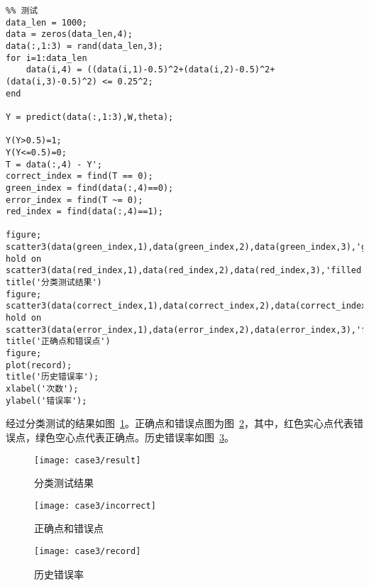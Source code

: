 \begin{lstlisting}
%% 测试
data_len = 1000;
data = zeros(data_len,4);
data(:,1:3) = rand(data_len,3);
for i=1:data_len
    data(i,4) = ((data(i,1)-0.5)^2+(data(i,2)-0.5)^2+(data(i,3)-0.5)^2) <= 0.25^2;
end

Y = predict(data(:,1:3),W,theta);

Y(Y>0.5)=1;
Y(Y<=0.5)=0;
T = data(:,4) - Y';
correct_index = find(T == 0);
green_index = find(data(:,4)==0);
error_index = find(T ~= 0);
red_index = find(data(:,4)==1);

figure;
scatter3(data(green_index,1),data(green_index,2),data(green_index,3),'g');
hold on
scatter3(data(red_index,1),data(red_index,2),data(red_index,3),'filled','r');
title('分类测试结果')
figure;
scatter3(data(correct_index,1),data(correct_index,2),data(correct_index,3),'g');
hold on
scatter3(data(error_index,1),data(error_index,2),data(error_index,3),'filled','r');
title('正确点和错误点')
figure;
plot(record);
title('历史错误率');
xlabel('次数');
ylabel('错误率');
\end{lstlisting}

经过分类测试的结果如图~\ref{fig:case3:result}。正确点和错误点图为图~\ref{fig:case3:incorrect}，其中，红色实心点代表错误点，绿色空心点代表正确点。历史错误率如图~\ref{fig:case3:record}。

\begin{figure}[h] 
 \centering
  \texttt{[image: case3/result]}
  \caption{分类测试结果}
  \label{fig:case3:result}
\end{figure}
\begin{figure}[h] 
 \centering
  \texttt{[image: case3/incorrect]}
  \caption{正确点和错误点}
  \label{fig:case3:incorrect}
\end{figure}
\begin{figure}[h] 
 \centering
  \texttt{[image: case3/record]}
  \caption{历史错误率}
  \label{fig:case3:record}
\end{figure}